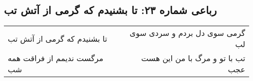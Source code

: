 \begin{center}
\section*{رباعی شماره ۲۳: تا بشنیدم که گرمی از آتش تب}
\label{sec:sh023}
\begin{longtable}{l p{0.5cm} r}
تا بشنیدم که گرمی از آتش تب
&&
گرمی سوی دل بردم و سردی سوی لب
\\
مرگست ندیمم از فراقت همه شب
&&
تب با تو و مرگ با من این هست عجب
\\
\end{longtable}
\end{center}

